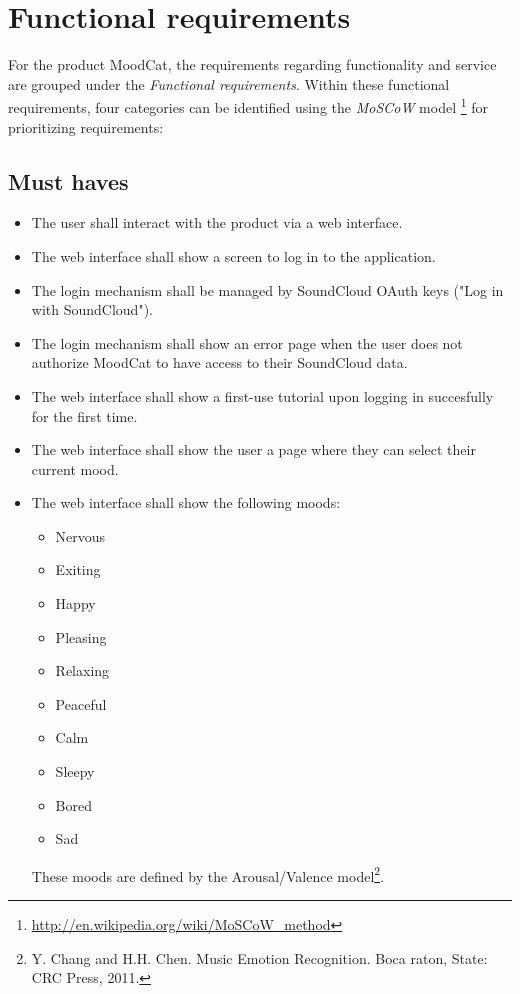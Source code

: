 \chapter{Functional requirements}
For the product MoodCat, the requirements regarding functionality and service are grouped under the \emph{Functional requirements}.
Within these functional requirements, four categories can be identified using the \emph{MoSCoW} model \footnote{\url{http://en.wikipedia.org/wiki/MoSCoW_method}} for prioritizing requirements:

\section{Must haves}
\begin{itemize}
\item The user shall interact with the product via a web interface.

\item The web interface shall show a screen to log in to the application.

\item The login mechanism shall be managed by SoundCloud OAuth keys ("Log in with SoundCloud").

\item The login mechanism shall show an error page when the user does not authorize MoodCat to have access to their SoundCloud data.

\item The web interface shall show a first-use tutorial upon logging in succesfully for the first time.

\item The web interface shall show the user a page where they can select their current mood.

\item The web interface shall show the following moods:
		\begin{itemize}
		\item Nervous
		\item Exiting
		\item Happy
		\item Pleasing
		\item Relaxing
		\item Peaceful
		\item Calm
		\item Sleepy
		\item Bored
		\item Sad
		\end{itemize}
	  These moods are defined by the Arousal/Valence model\footnote{Y. Chang and H.H. Chen. Music Emotion Recognition. Boca raton, State:
CRC Press, 2011.}.


\end{itemize}
